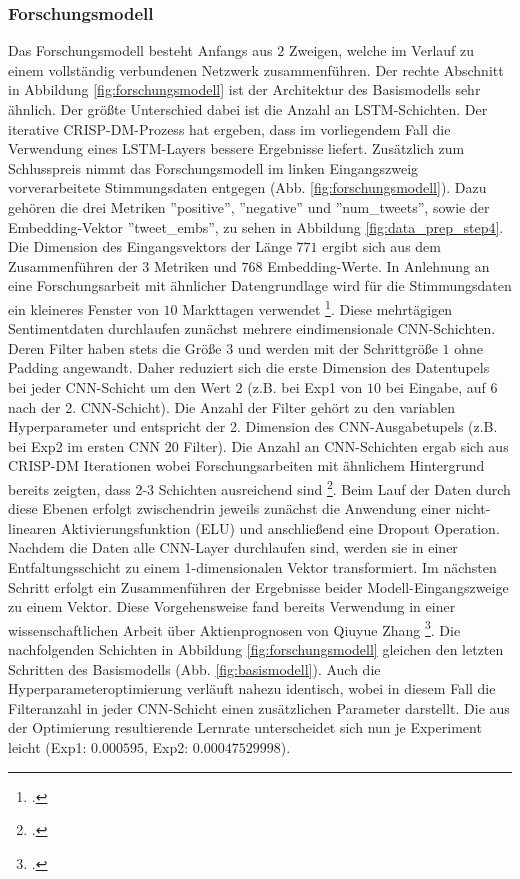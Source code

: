 \subsubsection{Forschungsmodell}\label{sec:modellierung_forsch}

Das Forschungsmodell besteht Anfangs aus $2$ Zweigen, welche im Verlauf zu einem vollständig verbundenen Netzwerk zusammenführen. Der rechte Abschnitt in Abbildung \ref{fig:forschungsmodell} ist der Architektur des Basismodells sehr ähnlich. Der größte Unterschied dabei ist die Anzahl an \ac{LSTM}-Schichten. Der iterative \ac{CRISP-DM}-Prozess hat ergeben, dass im vorliegendem Fall die Verwendung eines \ac{LSTM}-Layers bessere Ergebnisse liefert.
Zusätzlich zum Schlusspreis nimmt das Forschungsmodell im linken Eingangszweig vorverarbeitete Stimmungsdaten entgegen (Abb. \ref{fig:forschungsmodell}). Dazu gehören die drei Metriken ''positive'', ''negative'' und ''num\_tweets'', sowie der Embedding-Vektor ''tweet\_embs'', zu sehen in Abbildung \ref{fig:data_prep_step4}. Die Dimension des Eingangsvektors der Länge $771$ ergibt sich aus dem Zusammenführen der $3$ Metriken und $768$ Embedding-Werte. In Anlehnung an eine Forschungsarbeit mit ähnlicher Datengrundlage wird für die Stimmungsdaten ein kleineres Fenster von $10$ Markttagen verwendet \footcite[Kap. 4.1]{zhang2022transformer}.
Diese mehrtägigen Sentimentdaten durchlaufen zunächst mehrere eindimensionale \ac{CNN}-Schichten. Deren Filter haben stets die Größe $3$ und werden mit der Schrittgröße $1$ ohne Padding angewandt. Daher reduziert sich die erste Dimension des Datentupels bei jeder \ac{CNN}-Schicht um den Wert $2$ (z.B. bei Exp1 von $10$ bei Eingabe, auf $6$ nach der 2. \ac{CNN}-Schicht). Die Anzahl der Filter gehört zu den variablen Hyperparameter und entspricht der 2. Dimension des \ac{CNN}-Ausgabetupels (z.B. bei Exp2 im ersten CNN $20$ Filter).
Die Anzahl an \ac{CNN}-Schichten ergab sich aus \ac{CRISP-DM} Iterationen wobei Forschungsarbeiten mit ähnlichem Hintergrund bereits zeigten, dass 2-3 Schichten ausreichend sind \footcite[Kap. 8.2]{guan2020stockprice}. Beim Lauf der Daten durch diese Ebenen erfolgt zwischendrin jeweils zunächst die Anwendung einer nicht-linearen Aktivierungsfunktion (\ac{ELU}) und anschließend eine Dropout Operation.
Nachdem die Daten alle \ac{CNN}-Layer durchlaufen sind, werden sie in einer Entfaltungsschicht zu einem 1-dimensionalen Vektor transformiert.
Im nächsten Schritt erfolgt ein Zusammenführen der Ergebnisse beider Modell-Eingangszweige zu einem Vektor. Diese Vorgehensweise fand bereits Verwendung in einer wissenschaftlichen Arbeit über Aktienprognosen von Qiuyue Zhang \footcite[Kap. 4.2.1]{zhang2022transformer}.
Die nachfolgenden Schichten in Abbildung \ref{fig:forschungsmodell} gleichen den letzten Schritten des Basismodells (Abb. \ref{fig:basismodell}). Auch die Hyperparameteroptimierung verläuft nahezu identisch, wobei in diesem Fall die Filteranzahl in jeder CNN-Schicht einen zusätzlichen Parameter darstellt.
Die aus der Optimierung resultierende Lernrate unterscheidet sich nun je Experiment leicht (Exp1: $0.000595$, Exp2: $0.00047529998$).

